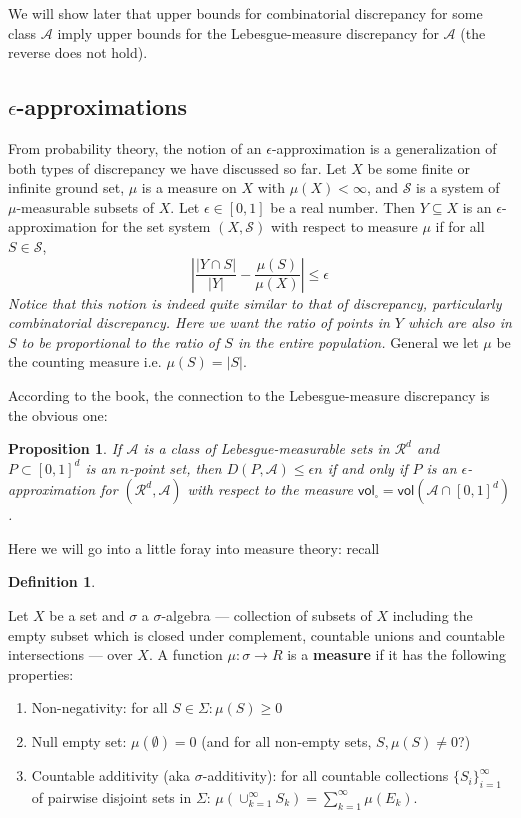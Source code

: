 \documentclass[twoside]{article}
\newtheorem{proposition}[theorem]{Proposition}
\newtheorem{definition}[theorem]{Definition}
\newcommand\vol{\mathsf{vol}}
\newcommand\R{\mathcal{R}}
\newcommand\A{\mathcal{A}}
\newcommand\SSet{\mathcal{S}}
\begin{document}
We will show later that upper bounds for combinatorial discrepancy for some class $\A$ imply upper bounds for the Lebesgue-measure discrepancy for $\A$ (the reverse does not hold). 

\subsection{$\epsilon$-approximations}
From probability theory, the notion of an $\epsilon$-approximation is a generalization of both types of discrepancy we have discussed so far. Let $X$ be some finite or infinite ground set, $\mu$ is a measure on $X$ with $\mu (X) < \infty$, and $\SSet$ is a system of $\mu$-measurable subsets of $X$. Let $\epsilon \in [0,1]$ be a real number. Then $Y \subseteq X$ is an $\epsilon$-approximation for the set system $(X, \SSet)$ with respect to measure $\mu$ if for all $S \in \SSet$,
\[\left| \frac{|Y \cap S|}{|Y|} - \frac{\mu(S)}{\mu(X)} \right| \leq \epsilon\]
\emph{Notice that this notion is indeed quite similar to that of discrepancy, particularly combinatorial discrepancy. Here we want the ratio of points in $Y$ which are also in $S$ to be proportional to the ratio of $S$ in the entire population.} General we let $\mu$ be the counting measure i.e. $\mu(S) = |S|$.

According to the book, the connection to the Lebesgue-measure discrepancy is the obvious one:
\begin{proposition}
If $\A$ is a class of Lebesgue-measurable sets in $\R^d$ and $P \subset [0,1]^d$ is an $n$-point set, then $D(P, \A) \leq \epsilon n$ if and only if $P$ is an $\epsilon$-approximation for $(\R^d, \A)$ with respect to the measure $\vol_{\square} = \vol(\A \cap [0,1]^d)$.
\end{proposition}

Here we will go into a little foray into measure theory: recall
\begin{definition}

\end{definition} 
Let $X$ be a set and $\sigma$ a $\sigma$-algebra --- collection of subsets of $X$ including the empty subset which is closed under complement, countable unions and countable intersections --- over $X$. A function $\mu: \sigma \rightarrow R$ is a \textbf{measure} if it has the following properties:
\begin{enumerate}
\item Non-negativity: for all $S \in \Sigma: \mu (S) \geq 0$
\item Null empty set: $\mu (\emptyset) = 0$ (and for all non-empty sets, $S, \mu(S) \neq 0$?)
\item Countable additivity (aka $\sigma$-additivity): for all countable collections $\{S_i\}_{i=1}^{\infty}$ of pairwise disjoint sets in $\Sigma$: $\mu (\cup_{k=1}^{\infty} S_k) = \sum_{k=1}^{\infty} \mu (E_k)$.
\end{enumerate}
\end{document}
